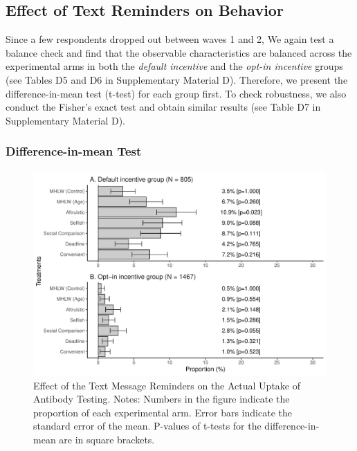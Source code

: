 \documentclass[
      12pt,
    a4paper
]{article}
\begin{document}
\hypertarget{behavior}{%
\subsection{Effect of Text Reminders on Behavior}\label{behavior}}

Since a few respondents dropped out between waves 1 and 2, We again test a balance check and find that the observable characteristics are balanced across the experimental arms in both the \emph{default incentive} and the \emph{opt-in incentive} groups (see Tables D5 and D6 in Supplementary Material D). Therefore, we present the difference-in-mean test (t-test) for each group first. To check robustness, we also conduct the Fisher's exact test and obtain similar results (see Table D7 in Supplementary Material D).

\hypertarget{difference-in-mean-test-1}{%
\subsubsection{Difference-in-mean Test}\label{difference-in-mean-test-1}}

\begin{figure}[t]
\includegraphics{Main-Document-LaTeX_files/figure-latex/ttest-act-test-1} \caption{Effect of the Text Message Reminders on the Actual Uptake of Antibody Testing. Notes: Numbers in the figure indicate the proportion of each experimental arm. Error bars indicate the standard error of the mean. P-values of t-tests for the difference-in-mean are in square brackets.}\label{fig:ttest-act-test}
\end{figure}
\end{document}
